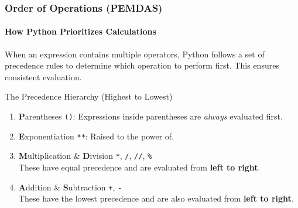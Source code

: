 \documentclass{beamer}
\begin{document}
\begin{frame}[fragile]
    \frametitle{Order of Operations (PEMDAS)}
    \framesubtitle{How Python Prioritizes Calculations}
    
    When an expression contains multiple operators, Python follows a set of precedence rules to determine which operation to perform first. This ensures consistent evaluation.

    \begin{block}{The Precedence Hierarchy (Highest to Lowest)}
        \begin{enumerate}
            \item \textbf{P}arentheses \texttt{()}: Expressions inside parentheses are \textit{always} evaluated first.
            \item \textbf{E}xponentiation \texttt{**}: Raised to the power of.
            \item \textbf{M}ultiplication \& \textbf{D}ivision \texttt{*}, \texttt{/}, \texttt{//}, \texttt{\%}\\
            These have equal precedence and are evaluated from \textbf{left to right}.
            \item \textbf{A}ddition \& \textbf{S}ubtraction \texttt{+}, \texttt{-}\\
            These have the lowest precedence and are also evaluated from \textbf{left to right}.
        \end{enumerate}
    \end{block}
\end{frame}
\end{document}
